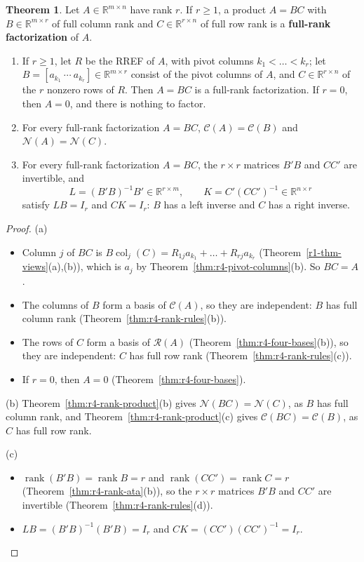 \documentclass[12pt]{article}
\newcommand{\R}{\mathbb R}
\DeclareMathOperator{\col}{col}
\DeclareMathOperator{\rank}{rank}
\theoremstyle{definition}
\newtheorem{theorem}{Theorem}
\begin{document}
\begin{theorem}\label{thm:r4-full-rank-factorization}
Let \(A\in\R^{m\times n}\) have rank \(r\). If \(r\geqslant1\), a product \(A=BC\) with
\(B\in\R^{m\times r}\) of full column rank and \(C\in\R^{r\times n}\) of full row rank is a
\textbf{full-rank factorization} of \(A\).
\begin{enumerate}
\item If \(r\geqslant1\), let \(R\) be the RREF of \(A\), with pivot columns \(k_1<\dots<k_r\); let
\(B=[a_{k_1}\ \cdots\ a_{k_r}]\in\R^{m\times r}\) consist of the pivot columns of \(A\), and
\(C\in\R^{r\times n}\) of the \(r\) nonzero rows of \(R\). Then \(A=BC\) is a full-rank
factorization. If \(r=0\), then \(A=0\), and there is nothing to factor.
\item For every full-rank factorization \(A=BC\), \(\mathcal C(A)=\mathcal C(B)\) and
\(\mathcal N(A)=\mathcal N(C)\).
\item For every full-rank factorization \(A=BC\), the \(r\times r\) matrices \(B'B\) and \(CC'\) are
invertible, and
\[
L=(B'B)^{-1}B'\in\R^{r\times m},\qquad K=C'(CC')^{-1}\in\R^{n\times r}
\]
satisfy \(LB=I_r\) and \(CK=I_r\): \(B\) has a left inverse and \(C\) has a right inverse.
\end{enumerate}
\end{theorem}
\begin{proof}
(a)
\begin{itemize}
\item Column \(j\) of \(BC\) is \(B\col_j(C)=R_{1j}a_{k_1}+\dots+R_{rj}a_{k_r}\)
(Theorem~\ref{r1-thm-views}(a),(b)), which
is \(a_j\) by Theorem~\ref{thm:r4-pivot-columns}(b). So \(BC=A\).
\item The columns of \(B\) form a basis of \(\mathcal C(A)\), so they are independent: \(B\) has full
column rank (Theorem~\ref{thm:r4-rank-rules}(b)).
\item The rows of \(C\) form a basis of \(\mathcal R(A)\) (Theorem~\ref{thm:r4-four-bases}(b)), so
they are independent: \(C\) has full row rank (Theorem~\ref{thm:r4-rank-rules}(c)).
\item If \(r=0\), then \(A=0\) (Theorem~\ref{thm:r4-four-bases}).
\end{itemize}
(b) Theorem~\ref{thm:r4-rank-product}(b) gives \(\mathcal N(BC)=\mathcal N(C)\), as \(B\) has full
column rank, and Theorem~\ref{thm:r4-rank-product}(c) gives \(\mathcal C(BC)=\mathcal C(B)\), as
\(C\) has full row rank.

(c)
\begin{itemize}
\item \(\rank(B'B)=\rank B=r\) and \(\rank(CC')=\rank C=r\) (Theorem~\ref{thm:r4-rank-ata}(b)), so
the \(r\times r\) matrices \(B'B\) and \(CC'\) are invertible (Theorem~\ref{thm:r4-rank-rules}(d)).
\item \(LB=(B'B)^{-1}(B'B)=I_r\) and \(CK=(CC')(CC')^{-1}=I_r\).\qedhere
\end{itemize}
\end{proof}
\end{document}
